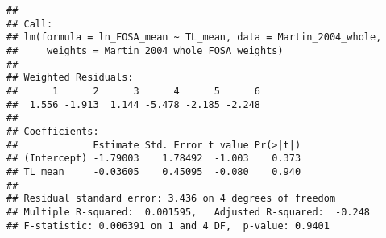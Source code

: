 \documentclass[
]{article}
\newenvironment{Shaded}{\begin{snugshade}}{\end{snugshade}}
\newcommand{\AttributeTok}[1]{\textcolor[rgb]{0.13,0.29,0.53}{#1}}
\newcommand{\DecValTok}[1]{\textcolor[rgb]{0.00,0.00,0.81}{#1}}
\newcommand{\FunctionTok}[1]{\textcolor[rgb]{0.13,0.29,0.53}{\textbf{#1}}}
\newcommand{\NormalTok}[1]{#1}
\newcommand{\OtherTok}[1]{\textcolor[rgb]{0.56,0.35,0.01}{#1}}
\newcommand{\SpecialCharTok}[1]{\textcolor[rgb]{0.81,0.36,0.00}{\textbf{#1}}}
\newcommand{\StringTok}[1]{\textcolor[rgb]{0.31,0.60,0.02}{#1}}
\begin{document}
\begin{Shaded}
\end{Shaded}

\begin{verbatim}
## 
## Call:
## lm(formula = ln_FOSA_mean ~ TL_mean, data = Martin_2004_whole, 
##     weights = Martin_2004_whole_FOSA_weights)
## 
## Weighted Residuals:
##      1      2      3      4      5      6 
##  1.556 -1.913  1.144 -5.478 -2.185 -2.248 
## 
## Coefficients:
##             Estimate Std. Error t value Pr(>|t|)
## (Intercept) -1.79003    1.78492  -1.003    0.373
## TL_mean     -0.03605    0.45095  -0.080    0.940
## 
## Residual standard error: 3.436 on 4 degrees of freedom
## Multiple R-squared:  0.001595,   Adjusted R-squared:  -0.248 
## F-statistic: 0.006391 on 1 and 4 DF,  p-value: 0.9401
\end{verbatim}
\end{document}
